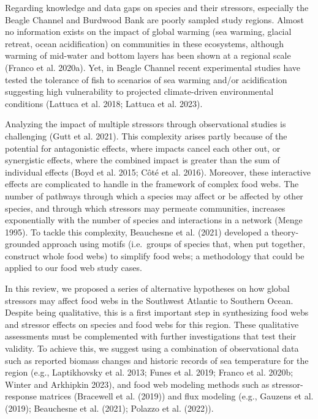 \documentclass[
]{article}
\begin{document}
Regarding knowledge and data gaps on species and their stressors,
especially the Beagle Channel and Burdwood Bank are poorly sampled study
regions. Almost no information exists on the impact of global warming
(sea warming, glacial retreat, ocean acidification) on communities in
these ecosystems, although warming of mid-water and bottom layers has
been shown at a regional scale (Franco et al. 2020a). Yet, in Beagle
Channel recent experimental studies have tested the tolerance of fish to
scenarios of sea warming and/or acidification suggesting high
vulnerability to projected climate-driven environmental conditions
(Lattuca et al. 2018; Lattuca et al. 2023).

Analyzing the impact of multiple stressors through observational studies
is challenging (Gutt et al. 2021). This complexity arises partly because
of the potential for antagonistic effects, where impacts cancel each
other out, or synergistic effects, where the combined impact is greater
than the sum of individual effects (Boyd et al. 2015; Côté et al. 2016).
Moreover, these interactive effects are complicated to handle in the
framework of complex food webs. The number of pathways through which a
species may affect or be affected by other species, and through which
stressors may permeate communities, increases exponentially with the
number of species and interactions in a network (Menge 1995). To tackle
this complexity, Beauchesne et al. (2021) developed a theory-grounded
approach using motifs (i.e.~groups of species that, when put together,
construct whole food webs) to simplify food webs; a methodology that
could be applied to our food web study cases.

In this review, we proposed a series of alternative hypotheses on how
global stressors may affect food webs in the Southwest Atlantic to
Southern Ocean. Despite being qualitative, this is a first important
step in synthesizing food webs and stressor effects on species and food
webs for this region. These qualitative assessments must be complemented
with further investigations that test their validity. To achieve this,
we suggest using a combination of observational data such as reported
biomass changes and historic records of sea temperature for the region
(e.g., Laptikhovsky et al. 2013; Funes et al. 2019; Franco et al. 2020b;
Winter and Arkhipkin 2023), and food web modeling methods such as
stressor-response matrices (Bracewell et al. (2019)) and flux modeling
(e.g., Gauzens et al. (2019); Beauchesne et al. (2021); Polazzo et al.
(2022)).
\end{document}
